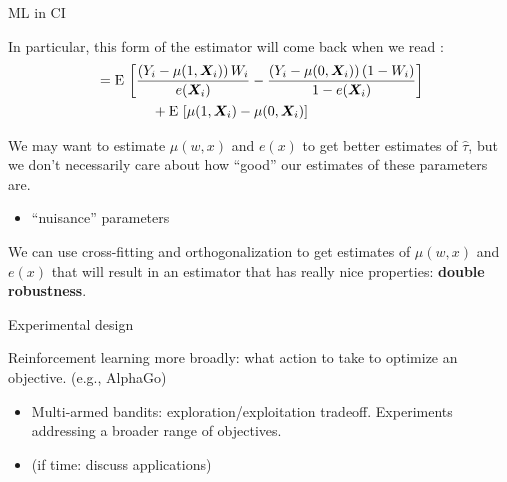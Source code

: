 \documentclass[xcolor={dvipsnames},handout]{beamer}
\begin{document}

\begin{frame}{ML in CI}

\begin{wideitemize}
\item In particular, this form of the estimator will come back when we read \cite{chernozhukov2018double, schuler2017targeted}:
\begin{align*}
      & = {\textrm E}\,\left[ \frac{\left(Y_i - \mu(1,\bm{X}_i)\right)  W_i}{e(\bm{X}_i)} - \frac{\left(Y_i - \mu(0,\bm{X}_i)\right) (1-W_i) }{1 - e(\bm{X}_i)}\right] \\
     & \qquad \qquad  + {\textrm E}\,\left[\mu(1,\bm{X}_i) - \mu(0,\bm{X}_i) \right]
\end{align*}
\pause
\item We may want to estimate $\mu(w,x)$ and $e(x)$ to get better estimates of $\hat \tau$, but we don't necessarily care about how ``good'' our estimates of these parameters are. \pause
\begin{itemize}
\item[$\rightarrow$] ``nuisance'' parameters
\end{itemize}
\item We can use cross-fitting and orthogonalization to get estimates of $\mu(w,x)$ and $e(x)$ that will result in an estimator that has really nice properties: \textbf{double robustness}. 
\end{wideitemize}

\end{frame}



\begin{frame}{Experimental design}

\begin{wideitemize}
\item Reinforcement learning more broadly: what action to take to optimize an objective. \pause (e.g., AlphaGo)\pause
\begin{itemize}
\item Multi-armed bandits: exploration/exploitation tradeoff. \pause Experiments addressing a broader range of objectives. \pause
\item (if time: discuss applications)
\end{itemize}

\end{wideitemize}

\end{frame}
\end{document}
